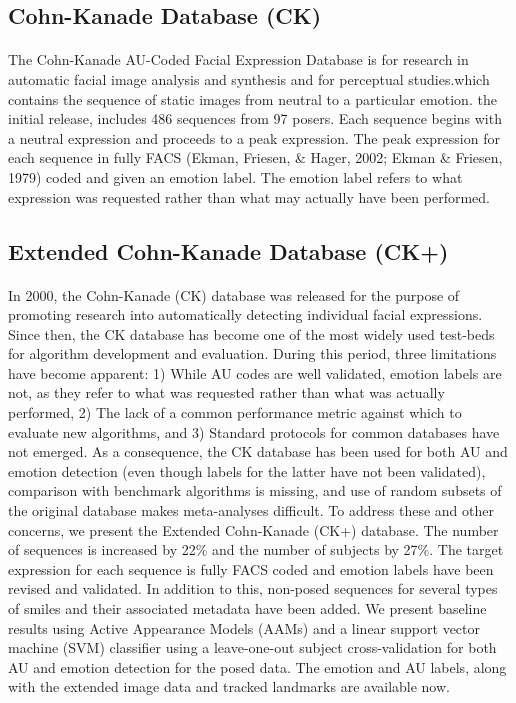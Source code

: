 \documentclass[a4paper,12pt,oneside]{article}
\begin{document}
\subsection{Cohn-Kanade Database (CK)}

\paragraph{}
The Cohn-Kanade AU-Coded Facial Expression Database is for research in automatic facial image analysis and synthesis and for perceptual studies.which contains the sequence of static images from neutral to a particular emotion.  the initial release, includes 486 sequences from 97 posers. Each sequence begins with a neutral expression and proceeds to a peak expression. The peak expression for each sequence in fully FACS (Ekman, Friesen, & Hager, 2002; Ekman & Friesen, 1979) coded and given an emotion label. The emotion label refers to what expression was requested rather than what may actually have been performed. 



\subsection{Extended Cohn-Kanade Database (CK+)}
\paragraph{}
In 2000, the Cohn-Kanade (CK) database was released for the purpose of promoting research into automatically detecting individual facial expressions. Since then, the CK database has become one of the most widely used test-beds for algorithm development and evaluation. During this period, three limitations have become apparent: 1) While AU codes are well validated, emotion labels are not, as they refer to what was requested rather than what was actually performed, 2) The lack of a common performance metric against which to evaluate new algorithms, and 3) Standard protocols for common databases have not emerged. As a consequence, the CK database has been used for both AU and emotion detection (even though labels for the latter have not been validated), comparison with benchmark algorithms is missing, and use of random subsets of the original database makes meta-analyses difficult. To address these and other concerns, we present the Extended Cohn-Kanade (CK+) database. The number of sequences is increased by 22\% and the number of subjects by 27\%. The target expression for each sequence is fully FACS coded and emotion labels have been revised and validated. In addition to this, non-posed sequences for several types of smiles and their associated metadata have been added. We present baseline results using Active Appearance Models (AAMs) and a linear support vector machine (SVM) classifier using a leave-one-out subject cross-validation for both AU and emotion detection for the posed data. The emotion and AU labels, along with the extended image data and tracked landmarks are available now.
\end{document}
